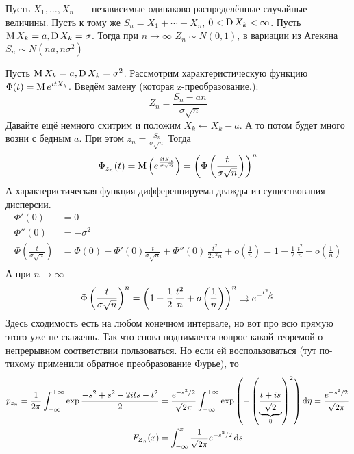 \documentclass[12pt,timbord]{../../../notes}
\begin{document}
\begin{thrm}\label{thrm:stat::randlimsum::sum}
  Пусть $X_1, \dotsc, X_n$~--- независимые одинаково распределённые случайные величины. Пусть к
  тому же $S_n = X_1 + \dotsb +  X_n$, $0 < \operatorname{D} X_k < \infty$.
  Пусть $\operatorname{M} X_k = a, \operatorname{D} X_k = \sigma$. Тогда при $n\to \infty$ $Z_n \sim N(0,1)$,
  в вариации из Агекяна $S_n \sim N(na,n\sigma^2)$
\end{thrm}
\begin{ittproof}
  Пусть $\operatorname{M} X_k = a, \operatorname{D} X_k = \sigma^2$.
  Рассмотрим характеристическую функцию $\Phi(t) = \operatorname{M} e^{itX_k}$. Введём замену (которая
  z-преобразование.):
  \[
    Z_n = \frac{S_n - a n}{\sigma \sqrt n}
  \]
  Давайте ещё немного схитрим и положим $X_k \gets X_k- a$. А то потом будет много возни с бедным
  $a$. При этом $z_n = \frac{S_n}{\sigma \sqrt n}$
  Тогда
  \[
    \Phi_{z_n} (t) = \operatorname{M} \left(e^{\frac{itS_n}{\sigma\sqrt n}} \right)=
    \left(\Phi\left(\frac{t}{\sigma \sqrt n} \right)\right)^n 
  \]
  А характеристическая функция дифференцируема дважды из существования дисперсии.
  \begin{align*}
    \Phi'(0) &= 0 \\
    \Phi''(0) &= - \sigma^2 \\
    \Phi\left(\frac{t}{\sigma \sqrt n} \right) 
    &= \Phi(0) + \Phi'(0) \frac{t}{\sigma \sqrt n} + \Phi''(0)\, \frac{t^2}{2\sigma^2 n} 
      + o\left(\frac{1}{n}\right)
    = 1  - \frac{1}{2}\,\frac{t^2}{n} +  o\left(\frac{1}{n}\right) \\
  \end{align*}
  А при $n\to \infty$ \[
    \Phi\left(\frac{t}{\sigma \sqrt n} \right)^n 
    = \left(1  - \frac{1}{2}\,\frac{t^2}{n} +  o\left(\frac{1}{n}\right)\right) ^n
    \rightrightarrows e^{-{}^{t^2}\!/_{\!2}}
  \]
  Здесь сходимость есть на любом конечном интервале, но вот про всю прямую этого уже не скажешь.
  Так что снова поднимается вопрос какой теоремой о непрерывном соответствии пользоваться.
  Но если ей воспользоваться (тут по-тихому применили обратное преобразование Фурье), то
  \begin{align*}
    p_{z_n}= \frac{1}{2\pi} \int_{-\infty}^{+\infty} \exp{\frac{- s^2 + s^2 - 2its - t^2}{2}}  &=
    \frac{e^{-s^2/2}}{\sqrt{2}\pi } 
    \int_{-\infty}^{+\infty} \exp\left(-\left(\underbrace{\frac{t+is}{\sqrt 2}}_\eta \right)^2\right) \mathrm{d} \eta 
    =\frac{e^{-s^2/2}}{\sqrt{2\pi} } \\
    F_{Z_n} (x) &= \int_{-\infty}^x \frac{1}{\sqrt{2\pi}} e^{-s^2/2} \, \mathrm{d} s 
  \end{align*}


\end{ittproof}
\end{document}
